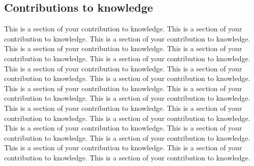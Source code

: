 {
\begin{doublespacing}
\begin{flushleft}

\section{Contributions to knowledge}

This is a section of your contribution to knowledge. This is a section of your contribution to knowledge. This is a section of your contribution to knowledge. This is a section of your contribution to knowledge. This is a section of your contribution to knowledge. This is a section of your contribution to knowledge. This is a section of your contribution to knowledge. This is a section of your contribution to knowledge. This is a section of your contribution to knowledge. This is a section of your contribution to knowledge. This is a section of your contribution to knowledge. This is a section of your contribution to knowledge. This is a section of your contribution to knowledge. This is a section of your contribution to knowledge.  This is a section of your contribution to knowledge. This is a section of your contribution to knowledge. This is a section of your contribution to knowledge. This is a section of your contribution to knowledge. This is a section of your contribution to knowledge. This is a section of your contribution to knowledge. This is a section of your contribution to knowledge. 


\end{flushleft}
\end{doublespacing}
}